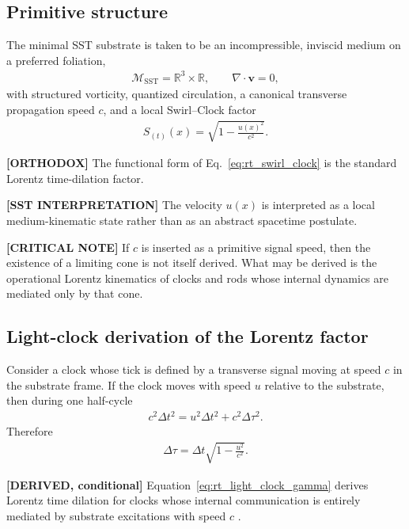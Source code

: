 \subsection{Primitive structure}

The minimal SST substrate is taken to be an incompressible, inviscid medium on a
preferred foliation,
\begin{align}
    \mathcal{M}_{\mathrm{SST}}
    =
    \mathbb{R}^3 \times \mathbb{R},
    \qquad
    \nabla\cdot \mathbf{v}=0 ,
\end{align}
with structured vorticity, quantized circulation, a canonical transverse
propagation speed \(c\), and a local Swirl--Clock factor
\begin{align}
    S_{(t)}(x)
    =
    \sqrt{1-\frac{u(x)^2}{c^2}} .
    \label{eq:rt_swirl_clock}
\end{align}

\textbf{[ORTHODOX]} The functional form of
Eq.~\eqref{eq:rt_swirl_clock} is the standard Lorentz time-dilation factor.

\textbf{[SST INTERPRETATION]} The velocity \(u(x)\) is interpreted as a local
medium-kinematic state rather than as an abstract spacetime postulate.

\textbf{[CRITICAL NOTE]} If \(c\) is inserted as a primitive signal speed, then
the existence of a limiting cone is not itself derived. What may be derived is
the operational Lorentz kinematics of clocks and rods whose internal dynamics
are mediated only by that cone.

\subsection{Light-clock derivation of the Lorentz factor}

Consider a clock whose tick is defined by a transverse signal moving at speed
\(c\) in the substrate frame. If the clock moves with speed \(u\) relative to
the substrate, then during one half-cycle
\begin{align}
    c^2 \Delta t^2
    =
    u^2 \Delta t^2 + c^2 \Delta \tau^2 .
\end{align}
Therefore
\begin{align}
    \Delta \tau
    =
    \Delta t
    \sqrt{1-\frac{u^2}{c^2}} .
    \label{eq:rt_light_clock_gamma}
\end{align}

\textbf{[DERIVED, conditional]} Equation~\eqref{eq:rt_light_clock_gamma}
derives Lorentz time dilation for clocks whose internal communication is
entirely mediated by substrate excitations with speed \(c\) \cite{Einstein1905}.

